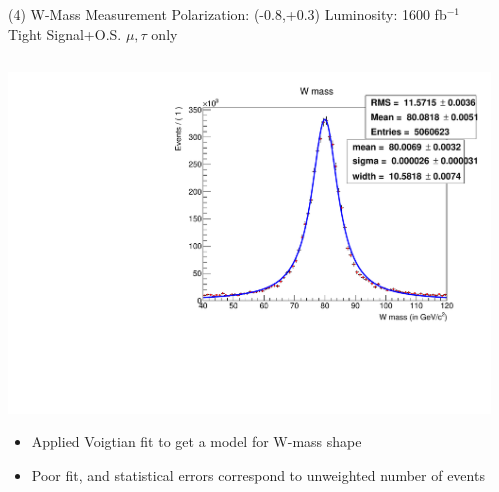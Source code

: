 \documentclass[10pt]{beamer}
\begin{document}
\begin{frame}{(4) W-Mass Measurement }
Polarization: (-0.8,+0.3)\quad
Luminosity: 1600 fb$^{-1}$\\
Tight Signal+O.S. $\mu ,\tau$ only\\
\scriptsize
\begin{columns}
\begin{column}{0.5\textwidth}
\includegraphics[scale=0.3, left]{WWSfit.pdf} \\
\begin{itemize}
\scriptsize
\item Applied Voigtian fit to get a model for W-mass shape
\item Poor fit, and statistical errors correspond to unweighted number of events
\end{itemize}
\end{column}
\begin{column}{0.5\textwidth}


\end{column}
\end{columns}
\end{frame}
\end{document}
